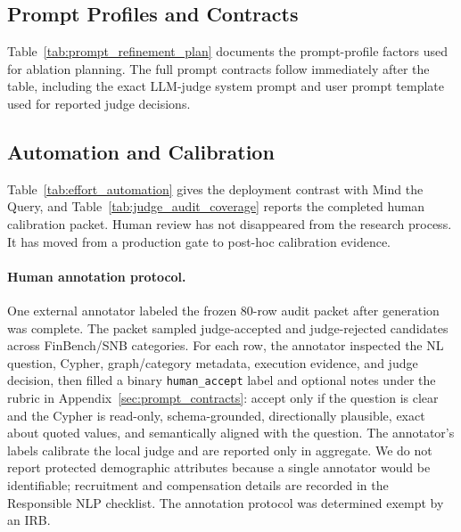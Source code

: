 \documentclass[11pt]{article}
\begin{document}


\subsection{Prompt Profiles and Contracts}

Table~\ref{tab:prompt_refinement_plan} documents the prompt-profile factors used for ablation planning. The full prompt contracts follow immediately after the table, including the exact LLM-judge system prompt and user prompt template used for reported judge decisions.




\subsection{Automation and Calibration}

Table~\ref{tab:effort_automation} gives the deployment contrast with Mind the Query, and Table~\ref{tab:judge_audit_coverage} reports the completed human calibration packet. Human review has not disappeared from the research process. It has moved from a production gate to post-hoc calibration evidence.

\paragraph{Human annotation protocol.}
One external annotator labeled the frozen 80-row audit packet after generation was complete. The packet sampled judge-accepted and judge-rejected candidates across FinBench/SNB categories. For each row, the annotator inspected the NL question, Cypher, graph/category metadata, execution evidence, and judge decision, then filled a binary \texttt{human\_accept} label and optional notes under the rubric in Appendix~\ref{sec:prompt_contracts}: accept only if the question is clear and the Cypher is read-only, schema-grounded, directionally plausible, exact about quoted values, and semantically aligned with the question. The annotator's labels calibrate the local judge and are reported only in aggregate. We do not report protected demographic attributes because a single annotator would be identifiable; recruitment and compensation details are recorded in the Responsible NLP checklist. The annotation protocol was determined exempt by an IRB.




\FloatBarrier
\clearpage

\end{document}
